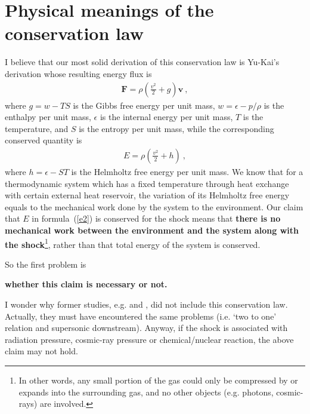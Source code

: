 \documentclass[fleqn,usenatbib]{mnras}
\begin{document}
\section{Physical meanings of the conservation law}
I believe that our most solid derivation of this conservation law is Yu-Kai's derivation whose resulting energy flux is
\begin{gather}
\mathbf{F}=\rho\left(\frac{v^{2}}{2}+g\right)\textbf{v}\ ,\label{e1}
\end{gather}
where $g=w-TS$ is the Gibbs free energy per unit mass, $w=\epsilon-p/\rho$ is the enthalpy per unit mass, $\epsilon$ is the internal energy per unit mass, $T$ is the temperature, and $S$ is the entropy per unit mass, while the corresponding conserved quantity is 
\begin{gather}
E=\rho\left(\frac{v^{2}}{2}+h\right)\ ,\label{e2}
\end{gather}
where $h=\epsilon-ST$ is the Helmholtz free energy per unit mass. We know that for a thermodynamic system which has a fixed temperature through heat exchange with certain external heat reservoir, the variation of its Helmholtz free energy equals to the mechanical work done by the system to the environment. Our claim that $E$ in formula~(\ref{e2}) is conserved for the shock means that \textbf{there is no mechanical work between the environment and the system along with the shock}\footnote{In other words, any small portion of the gas could only be compressed by or expands into the surrounding gas, and no other objects (e.g. photons, cosmic-rays) are involved.}, rather than that total energy of the system is conserved. 

So the first problem is

\textbf{whether this claim is necessary or not.}

I wonder why former studies, e.g. \citet{lou2014self} and \citet{yuLou2006}, did not include this conservation law. Actually, they must have encountered the same problems (i.e. `two to  one' relation and supersonic downstream). Anyway, if the shock is associated with radiation pressure, cosmic-ray pressure or chemical/nuclear reaction, the above claim may not hold.
\end{document}
